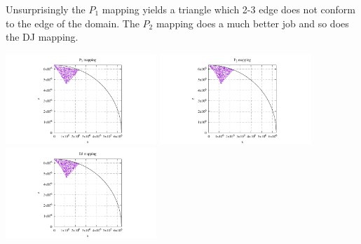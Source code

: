Unsurprisingly the $P_1$ mapping yields a triangle which 2-3 edge does not conform to the edge of the domain.
The $P_2$ mapping does a much better job and so does the DJ mapping.
\begin{center}
\includegraphics[width=5.7cm]{images/mappings/DJ/triangles/xz_P1.pdf}
\includegraphics[width=5.7cm]{images/mappings/DJ/triangles/xz_P2.pdf}
\includegraphics[width=5.7cm]{images/mappings/DJ/triangles/xz_DJ.pdf}
\end{center}

